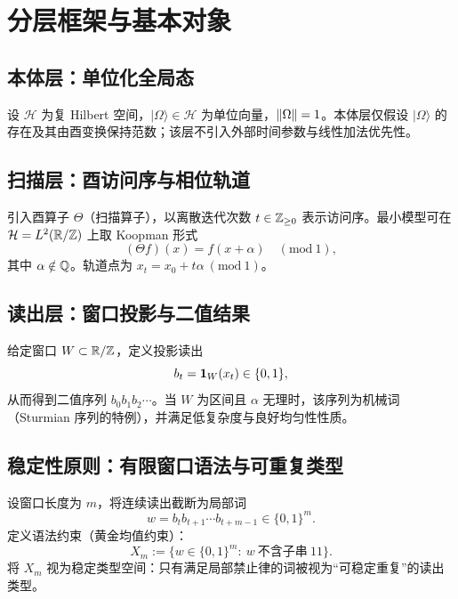 \section{分层框架与基本对象}

\subsection{本体层：单位化全局态}

设 $\mathcal H$ 为复 Hilbert 空间，$\lvert\Omega\rangle\in\mathcal H$ 为单位向量，$\left\lVert \Omega\right\rVert=1$。本体层仅假设 $\lvert\Omega\rangle$ 的存在及其由酉变换保持范数；该层不引入外部时间参数与线性加法优先性。

\subsection{扫描层：酉访问序与相位轨道}

引入酉算子 $\Theta$（扫描算子），以离散迭代次数 $t\in\mathbb{Z}_{\ge 0}$ 表示访问序。最小模型可在 $\mathcal H=L^2(\mathbb{R}/\mathbb{Z})$ 上取 Koopman 形式
\[
(\Theta f)(x)=f(x+\alpha)\quad(\mathrm{mod}\ 1),
\]
其中 $\alpha\notin\mathbb{Q}$。轨道点为 $x_t=x_0+t\alpha\ (\mathrm{mod}\ 1)$。

\subsection{读出层：窗口投影与二值结果}

给定窗口 $W\subset\mathbb{R}/\mathbb{Z}$，定义投影读出
\[
b_t=\mathbf{1}_W(x_t)\in\{0,1\},
\]
从而得到二值序列 $b_0b_1b_2\cdots$。当 $W$ 为区间且 $\alpha$ 无理时，该序列为机械词（Sturmian 序列的特例），并满足低复杂度与良好均匀性性质。

\subsection{稳定性原则：有限窗口语法与可重复类型}

设窗口长度为 $m$，将连续读出截断为局部词
\[
w=b_t b_{t+1}\cdots b_{t+m-1}\in\{0,1\}^m.
\]
定义语法约束（黄金均值约束）：
\[
X_m:=\{w\in\{0,1\}^m:\ w\ \text{不含子串}\ 11\}.
\]
将 $X_m$ 视为稳定类型空间：只有满足局部禁止律的词被视为“可稳定重复”的读出类型。

